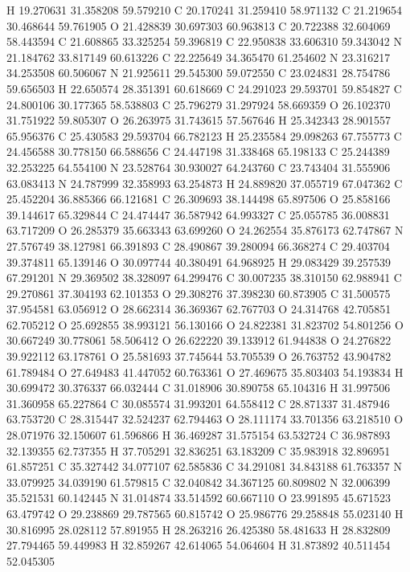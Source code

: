 \documentclass{article}
\begin{document}
H 19.270631 31.358208 59.579210
C 20.170241 31.259410 58.971132
C 21.219654 30.468644 59.761905
O 21.428839 30.697303 60.963813
C 20.722388 32.604069 58.443594
C 21.608865 33.325254 59.396819
C 22.950838 33.606310 59.343042
N 21.184762 33.817149 60.613226
C 22.225649 34.365470 61.254602
N 23.316217 34.253508 60.506067
N 21.925611 29.545300 59.072550
C 23.024831 28.754786 59.656503
H 22.650574 28.351391 60.618669
C 24.291023 29.593701 59.854827
C 24.800106 30.177365 58.538803
C 25.796279 31.297924 58.669359
O 26.102370 31.751922 59.805307
O 26.263975 31.743615 57.567646
H 25.342343 28.901557 65.956376
C 25.430583 29.593704 66.782123
H 25.235584 29.098263 67.755773
C 24.456588 30.778150 66.588656
C 24.447198 31.338468 65.198133
C 25.244389 32.253225 64.554100
N 23.528764 30.930027 64.243760
C 23.743404 31.555906 63.083413
N 24.787999 32.358993 63.254873
H 24.889820 37.055719 67.047362
C 25.452204 36.885366 66.121681
C 26.309693 38.144498 65.897506
O 25.858166 39.144617 65.329844
C 24.474447 36.587942 64.993327
C 25.055785 36.008831 63.717209
O 26.285379 35.663343 63.699260
O 24.262554 35.876173 62.747867
N 27.576749 38.127981 66.391893
C 28.490867 39.280094 66.368274
C 29.403704 39.374811 65.139146
O 30.097744 40.380491 64.968925
H 29.083429 39.257539 67.291201
N 29.369502 38.328097 64.299476
C 30.007235 38.310150 62.988941
C 29.270861 37.304193 62.101353
O 29.308276 37.398230 60.873905
C 31.500575 37.954581 63.056912
O 28.662314 36.369367 62.767703
O 24.314768 42.705851 62.705212
O 25.692855 38.993121 56.130166
O 24.822381 31.823702 54.801256
O 30.667249 30.778061 58.506412
O 26.622220 39.133912 61.944838
O 24.276822 39.922112 63.178761
O 25.581693 37.745644 53.705539
O 26.763752 43.904782 61.789484
O 27.649483 41.447052 60.763361
O 27.469675 35.803403 54.193834
H 30.699472 30.376337 66.032444
C 31.018906 30.890758 65.104316
H 31.997506 31.360958 65.227864
C 30.085574 31.993201 64.558412
C 28.871337 31.487946 63.753720
C 28.315447 32.524237 62.794463
O 28.111174 33.701356 63.218510
O 28.071976 32.150607 61.596866
H 36.469287 31.575154 63.532724
C 36.987893 32.139355 62.737355
H 37.705291 32.836251 63.183209
C 35.983918 32.896951 61.857251
C 35.327442 34.077107 62.585836
C 34.291081 34.843188 61.763357
N 33.079925 34.039190 61.579815
C 32.040842 34.367125 60.809802
N 32.006399 35.521531 60.142445
N 31.014874 33.514592 60.667110
O 23.991895 45.671523 63.479742
O 29.238869 29.787565 60.815742
O 25.986776 29.258848 55.023140
H 30.816995 28.028112 57.891955
H 28.263216 26.425380 58.481633
H 28.832809 27.794465 59.449983
H 32.859267 42.614065 54.064604
H 31.873892 40.511454 52.045305
\end{document}
